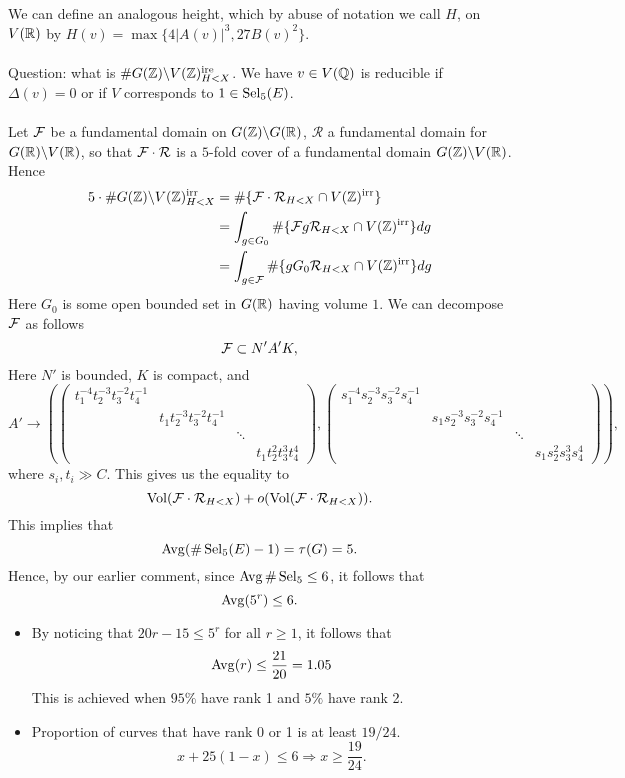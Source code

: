 \documentclass[12pt,amsfont]{amsart}
\begin{document}
We can define an analogous height, which by abuse of notation we call $H$, on $V({\mathbb R})$ by $H(v) = \max\{4|A(v)|^3, 27B(v)^2\}$. \\ \\
Question: what is $\# G({\mathbb Z})\backslash V({\mathbb Z})_{H < X}^{\text{ire}}$. We have $v \in V({\mathbb Q})$ is reducible if $\Delta(v) = 0$ or if $V$ corresponds to $1 \in \operatorname{Sel}_5(E)$. \\ \\
Let $\mathcal{F}$ be a fundamental domain on $G({\mathbb Z}) \backslash G({\mathbb R})$, $\mathcal{R}$ a fundamental domain for $G({\mathbb R}) \backslash V({\mathbb R})$, so that $\mathcal{F} \cdot \mathcal{R}$ is a $5$-fold cover of a fundamental domain $G({\mathbb Z}) \backslash V({\mathbb R})$. Hence
\begin{align*} \displaystyle 5 \cdot \# G({\mathbb Z}) \backslash V({\mathbb Z})_{H < X}^{\text{irr}} & = \# \{ \mathcal{F} \cdot \mathcal{R}_{H < X} \cap V({\mathbb Z})^{\text{irr}} \} \\
& = \int_{g \in G_0} \# \{\mathcal{F} g \mathcal{R}_{H < X} \cap V({\mathbb Z})^{\text{irr}} \} dg \\
& = \int_{g \in \mathcal{F}} \# \{g G_0 \mathcal{R}_{H < X} \cap V({\mathbb Z})^{\text{irr}} \} dg
\end{align*}
Here $G_0$ is some open bounded set in $G({\mathbb R})$ having volume $1$. We can decompose $\mathcal{F}$ as follows
\[\mathcal{F} \subset N' A' K,\]
Here $N'$ is bounded, $K$ is compact, and
\[A' \rightarrow \left( \begin{pmatrix} t_1^{-4} t_2^{-3} t_3^{-2} t_4^{-1} & & & \\ & t_1 t_2^{-3} t_3^{-2} t_4^{-1} & & \\ &  & \ddots & \\ & & & t_1 t_2^2 t_3^3 t_4^4 \end{pmatrix}, \begin{pmatrix} s_1^{-4} s_2^{-3} s_3^{-2} s_4^{-1} & & & \\ & s_1 s_2^{-3} s_3^{-2} s_4^{-1} & & \\ &  & \ddots & \\ & & & s_1 s_2^2 s_3^3 s_4^4 \end{pmatrix} \right),\] 
where $s_i, t_i \gg C$. This gives us the equality to
\[\operatorname{Vol}(\mathcal{F} \cdot \mathcal{R}_{H < X}) + o(\operatorname{Vol}(\mathcal{F} \cdot \mathcal{R}_{H < X})).\]
This implies that
\[\operatorname{Avg}(\# \operatorname{Sel}_5(E) - 1) = \tau(G) = 5.\]
Hence, by our earlier comment, since $\operatorname{Avg} \#\operatorname{Sel}_5 \leq 6$, it follows that
\[\operatorname{Avg}(5^r) \leq 6.\]
\begin{itemize}
\item
By noticing that $20r - 15 \leq 5^r$ for all $r \geq 1$, it follows that
\[\operatorname{Avg}(r) \leq \frac{21}{20} = 1.05\]
This is achieved when $95\%$ have rank 1 and $5\%$ have rank 2. 
\item
Proportion of curves that have rank 0 or 1 is at least $19/24.$
\[x + 25(1-x) \leq 6 \Rightarrow x \geq \frac{19}{24}.\]
\end{itemize}
\end{document}
